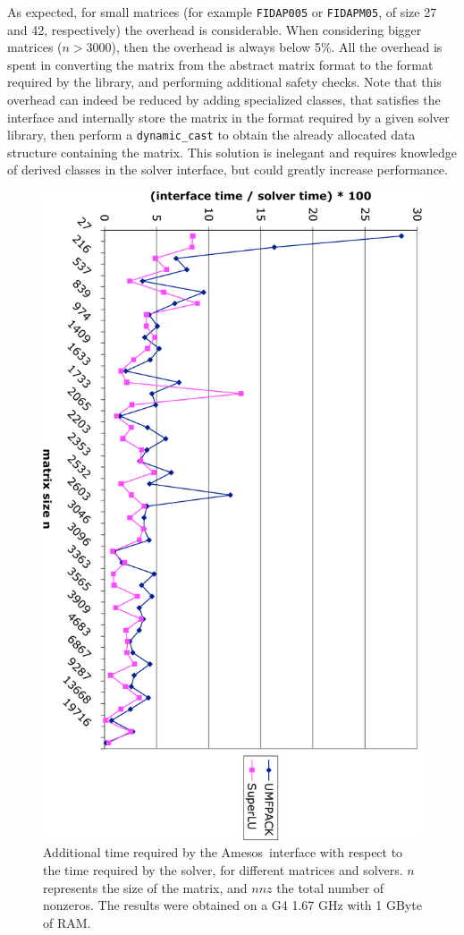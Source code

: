 \documentclass{llncs}
\newcommand{\amesos}{{\sc Amesos}}
\begin{document}
As expected, for small matrices (for example \verb!FIDAP005! or
\verb!FIDAPM05!, of size 27 and 42, respectively) the overhead is
considerable. When considering bigger matrices ($n > 3000$), then the overhead
is  always below 5\%. All the overhead is spent in converting the matrix from
the abstract matrix format to the format required by the
library, and performing additional safety checks.  Note that this overhead can
indeed be reduced by adding specialized classes, that satisfies the
interface and internally store the matrix in the format required
by a given solver library, then 
perform a {\tt dynamic\_cast} to obtain the already allocated data
structure containing the matrix. This solution is inelegant and requires
knowledge of derived classes in the solver interface, but could greatly
increase performance. 

\begin{figure}
\begin{center}
\includegraphics[angle=90,width=12cm]{../AmesosOverview/interface_time.pdf}
\caption{Additional time required by the \amesos\ interface with respect to the
time required by the solver, for different matrices and solvers. $n$
  represents the size of the matrix, and $nnz$ the total number of nonzeros.
The results were obtained on a G4 1.67 GHz with 1 GByte of RAM.}
\label{fig:results}
\end{center}
\end{figure}
\end{document}
